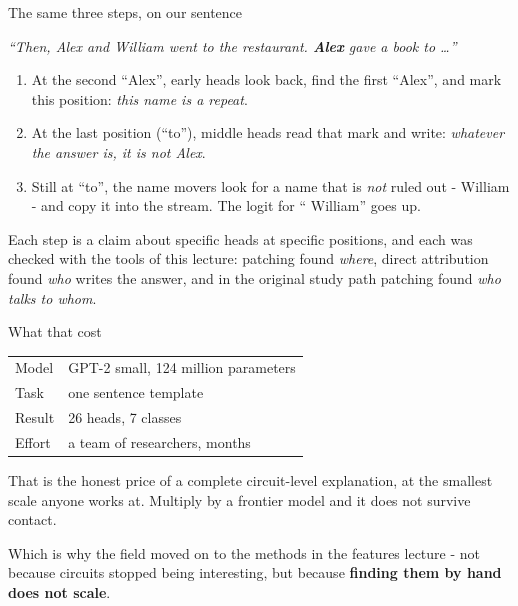\documentclass[aspectratio=169]{beamer}
\newcommand{\keybox}[1]{%
  \begin{tcolorbox}[colback=armblue!8, colframe=armblue, boxrule=0.6pt, arc=2pt]
  #1
  \end{tcolorbox}}
\newcommand{\trapbox}[1]{%
  \begin{tcolorbox}[colback=armred!8, colframe=armred, boxrule=0.6pt, arc=2pt]
  #1
  \end{tcolorbox}}
\newcommand{\takebox}[1]{%
  \begin{tcolorbox}[colback=paramgreen!8, colframe=paramgreen, boxrule=0.6pt, arc=2pt]
  #1
  \end{tcolorbox}}
\newcommand{\promptbox}[1]{%
  \begin{center}
  \begin{tcolorbox}[colback=lightbg, colframe=gray, boxrule=0.5pt, arc=2pt, width=0.88\textwidth]
    \centering\textit{#1}
  \end{tcolorbox}
  \end{center}}
\begin{document}
\begin{frame}{The same three steps, on our sentence}
  \vspace{0.3em}
  \promptbox{``Then, Alex and William went to the restaurant. \textbf{Alex} gave a book to \ldots''}

  \vspace{0.2em}
  \begin{enumerate}
    \item At the second ``Alex'', early heads look back, find the first ``Alex'', and mark this
      position: \emph{this name is a repeat}.
    \item At the last position (``to''), middle heads read that mark and write: \emph{whatever the
      answer is, it is not Alex}.
    \item Still at ``to'', the name movers look for a name that is \emph{not} ruled out - William -
      and copy it into the stream. The logit for `` William'' goes up.
  \end{enumerate}

  \vspace{0.5em}
  \keybox{\small Each step is a claim about specific heads at specific positions, and each was
  checked with the tools of this lecture: patching found \emph{where}, direct attribution found
  \emph{who} writes the answer, and in the original study path patching found \emph{who talks
  to whom}.}
\end{frame}

\begin{frame}{What that cost}
  \vspace{1.0em}
  \begin{center}
  \small
  \begin{tabular}{@{}ll@{}}
    \toprule
    Model & GPT-2 small, 124 million parameters\\
    Task & one sentence template\\
    Result & 26 heads, 7 classes\\
    Effort & a team of researchers, months\\
    \bottomrule
  \end{tabular}
  \end{center}

  \vspace{0.8em}
  \trapbox{\small That is the honest price of a complete circuit-level explanation, at the
  smallest scale anyone works at. Multiply by a frontier model and it does not survive contact.}

  \vspace{0.5em}
  \takebox{\small Which is why the field moved on to the methods in the features lecture - not
  because circuits stopped being interesting, but because \textbf{finding them by hand does not
  scale}.}
\end{frame}
\end{document}
